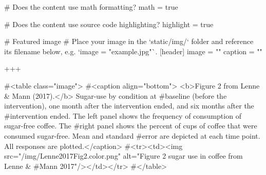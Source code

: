 # Does the content use math formatting?
math = true

# Does the content use source code highlighting?
highlight = true

# Featured image
# Place your image in the `static/img/` folder and reference its filename below, e.g. `image = "example.jpg"`.
[header]
image = ""
caption = ""

+++

#<table class="image">
#<caption align="bottom"> <b>Figure 2 from Lenne & Mann (2017).</b> Sugar-use by condition at #baseline (before the intervention), one month after the intervention ended, and six months after the #intervention ended. The left panel shows the frequency of consumption of sugar-free coffee. The #right panel shows the percent of cups of coffee that were consumed sugar-free. Mean and standard #error are depicted at each time point. All responses are plotted.</caption>
#<tr><td><img src="/img/Lenne2017Fig2.color.png" alt="Figure 2 sugar use in coffee from Lenne & #Mann 2017"/></td></tr>
#</table>

